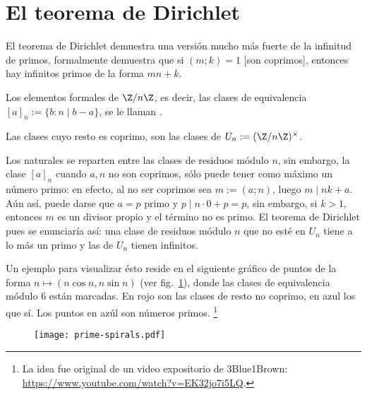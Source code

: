 \documentclass[teoria-numeros.tex]{subfiles}
\begin{document}
\section{El teorema de Dirichlet}\label{sec:dirichlets_thm}
El teorema de Dirichlet demuestra una versión mucho más fuerte de la infinitud de primos, formalmente
demuestra que si $(m; k) = 1$ [son coprimos], entonces hay infinitos primos de la forma $mn + k$.
\begin{mydef}
	Los elementos formales de $\Z/n\Z$, es decir, las clases de equivalencia $[a]_n := \{b : n\mid b-a\}$,
	se le llaman .
	\par
	Las clases cuyo resto es coprimo, son las clases de $U_n := (\Z/n\Z)^\times$.
\end{mydef}
Los naturales se reparten entre las clases de residuos módulo $n$, sin embargo, la clase $[a]_n$ cuando $a, n$ no son coprimos,
sólo puede tener como máximo un número primo: en efecto, al no ser coprimos sea $m := (a; n)$, luego $m \mid nk + a$.
Aún así, puede darse que $a = p$ primo y $p \mid n\cdot 0 + p = p$, sin embargo, si $k > 1$, entonces $m$ es un divisor propio y el término no es primo.
El teorema de Dirichlet pues se enunciaría así: una clase de residuos módulo $n$ que no esté en $U_n$ tiene a lo más un primo y las de $U_n$ tienen infinitos.

Un ejemplo para visualizar ésto reside en el siguiente gráfico de puntos de la forma $n \mapsto (n\cos n, n\sin n)$ (ver fig.~\ref{fig:prime-spirals}),
donde las clases de equivalencia módulo 6 están marcadas. En rojo son las clases de resto no coprimo, en azul los que sí. Los puntos en azúl son números primos.%
\footnote{La idea fue original de un video expositorio de 3Blue1Brown: \url{https://www.youtube.com/watch?v=EK32jo7i5LQ}.} 
\begin{figure}[!bht]
	\centering
	\texttt{[image: prime-spirals.pdf]}
	\caption{}%
	\label{fig:prime-spirals}
\end{figure}
\end{document}
